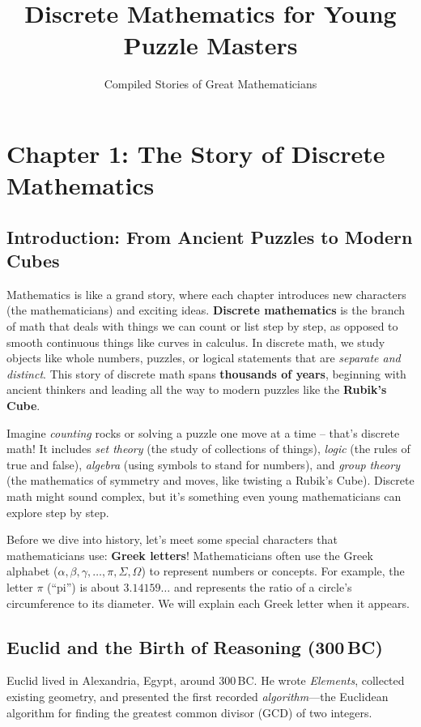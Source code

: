 \documentclass[12pt]{article}
\title{Discrete Mathematics for Young Puzzle Masters}
\author{Compiled Stories of Great Mathematicians}
\date{}
\begin{document}
\newpage

\section*{Chapter 1: The Story of Discrete Mathematics}

\subsection*{Introduction: From Ancient Puzzles to Modern Cubes}

Mathematics is like a grand story, where each chapter introduces new characters (the mathematicians) and exciting ideas. \textbf{Discrete mathematics} is the branch of math that deals with things we can count or list step by step, as opposed to smooth continuous things like curves in calculus. In discrete math, we study objects like whole numbers, puzzles, or logical statements that are \emph{separate and distinct}. This story of discrete math spans \textbf{thousands of years}, beginning with ancient thinkers and leading all the way to modern puzzles like the \textbf{Rubik’s Cube}.

Imagine \emph{counting} rocks or solving a puzzle one move at a time – that’s discrete math! It includes \emph{set theory} (the study of collections of things), \emph{logic} (the rules of true and false), \emph{algebra} (using symbols to stand for numbers), and \emph{group theory} (the mathematics of symmetry and moves, like twisting a Rubik’s Cube). Discrete math might sound complex, but it’s something even young mathematicians can explore step by step.

Before we dive into history, let’s meet some special characters that mathematicians use: \textbf{Greek letters}! Mathematicians often use the Greek alphabet (\(\alpha, \beta, \gamma, \dots, \pi, \Sigma, \Omega\)) to represent numbers or concepts. For example, the letter \(\pi\) (“pi”) is about \(3.14159\ldots\) and represents the ratio of a circle’s circumference to its diameter. We will explain each Greek letter when it appears.

\subsection*{Euclid and the Birth of Reasoning (300\,BC)}

Euclid lived in Alexandria, Egypt, around 300\,BC. He wrote \emph{Elements}, collected existing geometry, and presented the first recorded \emph{algorithm}—the Euclidean algorithm for finding the greatest common divisor (GCD) of two integers.
\end{document}
